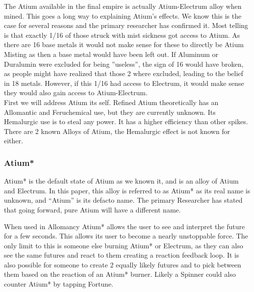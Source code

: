 \documentclass[conference]{IEEEtran}
\begin{document}
The Atium available in the final empire\cite{TFE-CH13} is actually Atium-Electrum alloy when mined.\cite{atium-electrum}  This goes a long way to explaining Atium's effects.  We know this is the case for several reasons and the primary researcher has confirmed it.  Most telling is that exactly 1/16 of those struck with mist sickness got access to Atium.\cite{HoA-CH70}  As there are 16 base metals it would not make sense for these to directly be Atium Misting as then a base metal would have been left out.  If Aluminum or Duralumin were excluded for being ''useless'', the sign of 16 would have broken, as people might have realized that those 2 where excluded, leading to the belief in 18 metals.  However, if this 1/16 had access to Electrum, it would make sense they would also gain access to Atium-Electrum.\\

First we will address Atium its self.  Refined Atium theoretically has an Allomantic and Feruchemical use, but they are currently unknown.  Its Hemalurgic use is to steal any power.\cite{HE-TB}  It has a higher efficiency than other spikes.\cite{atium-efficency}\\

There are 2 known Alloys of Atium, the Hemalurgic effect is not known for either.\\

\subsubsection*{\textbf{Atium*}}\hfill\break\indent Atium* is the default state of Atium as we known it, and is an alloy of Atium and Electrum.\cite{atium-electrum}  In this paper, this alloy is referred to as Atium* as its real name is unknown, and ``Atium'' is its defacto name.  The primary Researcher has stated that going forward, pure Atium will have a different name.\cite{Atium-pu-name}

When used in Allomancy Atium* allows the user to see and interpret the future for a few seconds.  This allows its user to become a nearly unstoppable force.\cite{TFE-CH14}  The only limit to this is someone else burning Atium*\cite{TFE-CH13} or Electrum,\cite{HoA-CH3} as they can also see the same futures and react to them creating a reaction feedback loop.  It is also possible for someone to create 2 equally likely futures and to pick between them based on the reaction of an Atium* burner.\cite{WoA-CH47}  Likely a Spinner could also counter Atium* by tapping Fortune.\\
\end{document}
